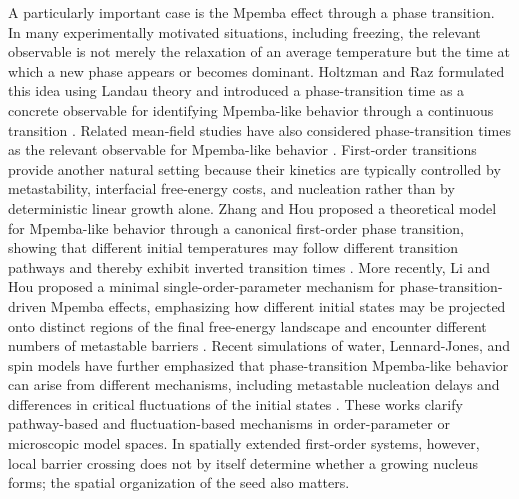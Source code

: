 ﻿\documentclass[aps,pre,preprint,showkeys,amsmath,amssymb,superscriptaddress,longbibliography]{revtex4-2}
\begin{document}
A particularly important case is the Mpemba effect through a phase transition. In many experimentally motivated situations, including freezing, the relevant observable is not merely the relaxation of an average temperature but the time at which a new phase appears or becomes dominant. Holtzman and Raz formulated this idea using Landau theory and introduced a phase-transition time as a concrete observable for identifying Mpemba-like behavior through a continuous transition \cite{Holtzman2022}. Related mean-field studies have also considered phase-transition times as the relevant observable for Mpemba-like behavior \cite{YangHou2020PRE,YangHou2022}. First-order transitions provide another natural setting because their kinetics are typically controlled by metastability, interfacial free-energy costs, and nucleation \cite{BeckerDoring1935,Langer1969,GuntonSanMiguelSahni1983,Binder1987,KeltonGreer2010} rather than by deterministic linear growth alone. Zhang and Hou proposed a theoretical model for Mpemba-like behavior through a canonical first-order phase transition, showing that different initial temperatures may follow different transition pathways and thereby exhibit inverted transition times \cite{ZhangHou2022}. More recently, Li and Hou proposed a minimal single-order-parameter mechanism for phase-transition-driven Mpemba effects, emphasizing how different initial states may be projected onto distinct regions of the final free-energy landscape and encounter different numbers of metastable barriers \cite{LiHou2026Entropy}. Recent simulations of water, Lennard-Jones, and spin models have further emphasized that phase-transition Mpemba-like behavior can arise from different mechanisms, including metastable nucleation delays and differences in critical fluctuations of the initial states \cite{GhoshPathakChatterjeeDas2025}. These works clarify pathway-based and fluctuation-based mechanisms in order-parameter or microscopic model spaces. In spatially extended first-order systems, however, local barrier crossing does not by itself determine whether a growing nucleus forms; the spatial organization of the seed also matters.
\end{document}
